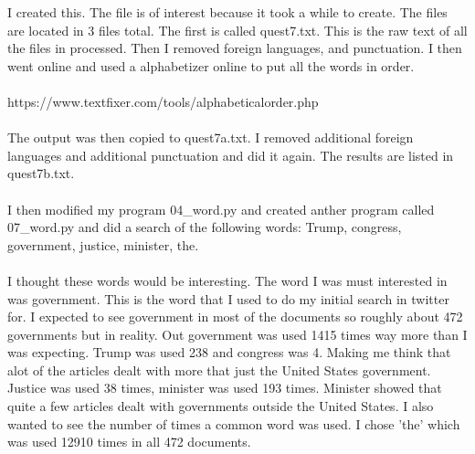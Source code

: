 \documentclass[10pt,letterpaper]{article}
\begin{document}
I created this.  The file is of interest because it took a while to create.  The files are located in 3 files total.  The first is called quest7.txt.  This is the raw text of all the files in processed.  Then I removed foreign languages, and punctuation.  I then went online and used a alphabetizer online to put all the words in order.\\
\\ 
https://www.textfixer.com/tools/alphabetical\-order.php\\
\\
The output was then copied to quest7a.txt.  I removed additional foreign  languages and additional punctuation and did it again.  The results are listed in quest7b.txt.\\
\\
I then modified my program 04\_word.py and created anther program called 07\_word.py and did a search of the following words:  Trump, congress, government, justice, minister, the.\\
\\
I thought these words would be interesting.  The word I was must interested in was government.  This is the word that I used to do my initial search in twitter for.  I expected to see government in most of the documents so roughly about 472 governments but in reality.  Out government was used 1415 times way more than I was expecting.  Trump was used 238 and congress was 4.  Making me think that alot of the articles dealt with more that just the United States government.  Justice was used 38 times, minister was used 193 times.  Minister showed that quite a few articles dealt with governments outside the United States.  I also wanted to see the number of times a common word was used.  I chose 'the' which was used 12910 times in all 472 documents.\\
\pagebreak
\end{document}
